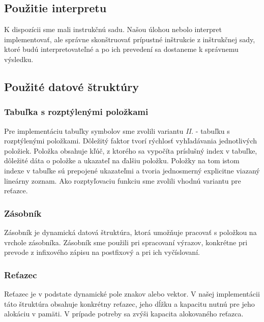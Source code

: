 \documentclass[a4paper, 12pt]{article}
\begin{document}
\bigskip
\bigskip
\subsection{Použitie interpretu} \label{interpret}

K dispozícii sme mali instrukčnú sadu. Našou úlohou nebolo interpret implementovať, ale správne skonštruovať prípustné inštrukcie z inštrukčnej sady, ktoré budú interpretovateľné a po ich prevedení sa dostaneme k správnemu výsledku.

\newpage

\subsection{Použité datové štruktúry} \label{datastructs}

\subsubsection{Tabuľka s rozptýlenými položkami}
Pre implementáciu tabuľky symbolov sme zvolili variantu \textit{II.} - tabuľku s rozptýlenými položkami. Dôležitý faktor tvorí rýchlosť vyhľadávania jednotlivých položiek. Položka obsahuje kľúč, z ktorého sa vypočíta príslušný index v tabuľke, dôležité dáta o položke a ukazateľ na ďalšiu položku. Položky na tom istom indexe v tabuľke sú prepojené ukazateľmi a tvoria jednosmerný explicitne viazaný lineárny zoznam. Ako rozptyľovaciu funkciu sme zvolili vhodnú variantu pre reťazce.

\subsubsection{Zásobník}
Zásobník je dynamická datová štruktúra, ktorá umožňuje pracovať s položkou na vrchole zásobníka. Zásobník sme použili pri spracovaní výrazov, konkrétne pri prevode z infixového zápisu na postfixový a pri ich vyčíslovaní.  

\subsubsection{Reťazec}
Reťazec je v podstate dynamické pole znakov alebo vektor. V našej implementácii táto štruktúra obsahuje konkrétny reťazec, jeho dĺžku a kapacitu nutnú pre jeho alokáciu v pamäti. V prípade potreby sa zvýši kapacita alokovaného reťazca.
\end{document}
